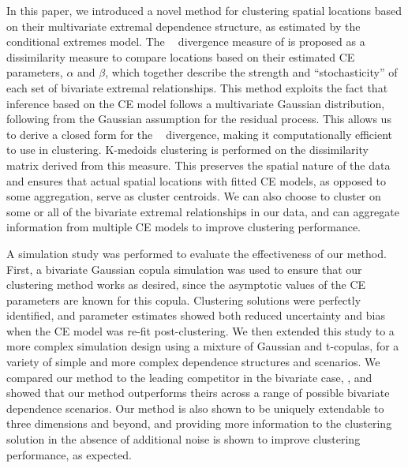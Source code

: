 \documentclass[
  12pt]{article}
\newcommand{\JSGa}{\mathop{\mathrm{JS}^{\mathrm{G}_{\lambda}}}\nolimits}
\DeclareMathOperator{\CE}{\mathrm{CE}}
\begin{document}
In this paper, we introduced a novel method for clustering spatial locations based on their multivariate extremal dependence structure, as estimated by the conditional extremes model.
The $\JSGa{}$ divergence measure of \citet{Nielsen2019} is proposed as a dissimilarity measure to compare locations based on their estimated CE parameters, $\alpha$ and $\beta$, which together describe the strength and ``stochasticity'' of each set of bivariate extremal relationships. 
This method exploits the fact that inference based on the CE model follows a multivariate Gaussian distribution, following from the Gaussian assumption for the residual process.
This allows us to derive a closed form for the $\JSGa{}$ divergence, making it computationally efficient to use in clustering.
K-medoids clustering is performed on the dissimilarity matrix derived from this measure.
This preserves the spatial nature of the data and ensures that actual spatial locations with fitted CE models, as opposed to some aggregation, serve as cluster centroids. 
We can also choose to cluster on some or all of the bivariate extremal relationships in our data, and can aggregate information from multiple CE models to improve clustering performance.

A simulation study was performed to evaluate the effectiveness of our method.
First, a bivariate Gaussian copula simulation was used to ensure that our clustering method works as desired, since the asymptotic values of the CE parameters are known for this copula.
Clustering solutions were perfectly identified, and parameter estimates showed both reduced uncertainty and bias when the CE model was re-fit post-clustering. 
We then extended this study to a more complex simulation design using a mixture of Gaussian and t-copulas, for a variety of simple and more complex dependence structures and scenarios.
We compared our method to the leading competitor in the bivariate case, \citet{Vignotto2021}, and showed that our method outperforms theirs across a range of possible bivariate dependence scenarios. 
Our method is also shown to be uniquely extendable to three dimensions and beyond, and providing more information to the clustering solution in the absence of additional noise is shown to improve clustering performance, as expected.
\end{document}
